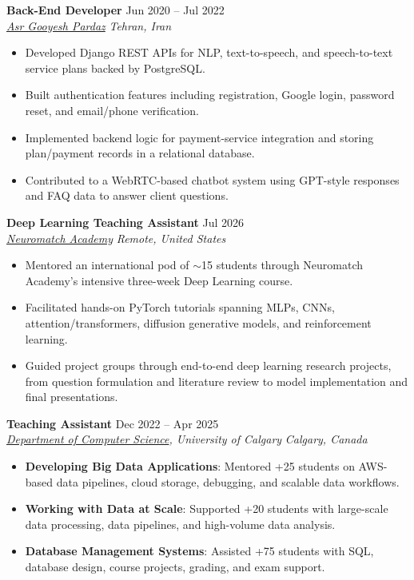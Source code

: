 \documentclass[a4paper,10pt]{article}
\newcommand{\resumeSubheading}[4]{
    \textbf{#1} \hfill #2 \\
    \textit{#3} \hfill \textit{#4}
}
\begin{document}
\resumeSubheading
{Back-End Developer}
{Jun 2020 -- Jul 2022}
{\href{https://asr-gooyesh.com/en/}{Asr Gooyesh Pardaz}}
{Tehran, Iran}
\begin{itemize}[leftmargin=0.25in]
    \item Developed Django REST APIs for NLP, text-to-speech, and speech-to-text service plans backed by PostgreSQL.
    \item Built authentication features including registration, Google login, password reset, and email/phone verification.
    \item Implemented backend logic for payment-service integration and storing plan/payment records in a relational database.
    \item Contributed to a WebRTC-based chatbot system using GPT-style responses and FAQ data to answer client questions.
\end{itemize}

\resumeSubheading
{Deep Learning Teaching Assistant}
{Jul 2026}
{\href{https://neuromatch.io/}{Neuromatch Academy}}
{Remote, United States}
\begin{itemize}[leftmargin=0.25in]
    \item Mentored an international pod of $\sim$15 students through Neuromatch Academy's intensive three-week Deep Learning course.
    \item Facilitated hands-on PyTorch tutorials spanning MLPs, CNNs, attention/transformers, diffusion generative models, and reinforcement learning.
    \item Guided project groups through end-to-end deep learning research projects, from question formulation and literature review to model implementation and final presentations.
\end{itemize}

\resumeSubheading
{Teaching Assistant}
{Dec 2022 -- Apr 2025}
{\href{https://science.ucalgary.ca/computer-science} {Department of Computer Science}, University of Calgary}
{Calgary, Canada}
\begin{itemize}[leftmargin=0.25in]
    \item \textbf{Developing Big Data Applications}: Mentored +25 students on AWS-based data pipelines, cloud storage, debugging, and scalable data workflows.
    \item \textbf{Working with Data at Scale}: Supported +20 students with large-scale data processing, data pipelines, and high-volume data analysis.
    \item \textbf{Database Management Systems}: Assisted +75 students with SQL, database design, course projects, grading, and exam support.
\end{itemize}
\end{document}
